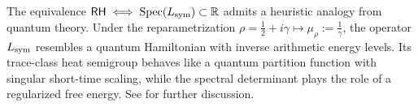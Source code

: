 \begin{remark}
\label{rem:spectral_physics_analogy}
The equivalence \(\mathsf{RH} \iff \operatorname{Spec}(L_{\mathrm{sym}}) \subset \mathbb{R}\) admits a heuristic analogy from quantum theory. Under the reparametrization \(\rho = \tfrac{1}{2} + i\gamma \mapsto \mu_\rho := \tfrac{1}{\gamma}\), the operator \(L_{\mathrm{sym}}\) resembles a quantum Hamiltonian with inverse arithmetic energy levels. Its trace-class heat semigroup behaves like a quantum partition function with singular short-time scaling, while the spectral determinant plays the role of a regularized free energy. See  for further discussion.
\end{remark}
